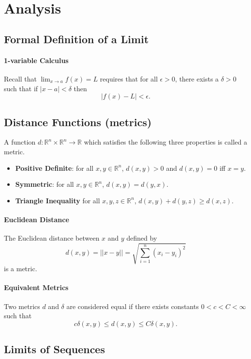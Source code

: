 
\section{Analysis}

\subsection{Formal Definition of a Limit}
\paragraph{1-variable Calculus}
Recall that \(\lim_{x\to a} f(x) = L\) requires that for all \(\epsilon > 0\),
there exists a \(\delta > 0 \) such that if \(|x-a| < \delta\)
then \[|f(x) - L| < \epsilon.\]

\subsection{Distance Functions (metrics)}
A function 
\(d: \mathbb{R}^n \times \mathbb{R}^n \to \mathbb{R}\)
which satisfies the following three properties is called a metric.
\begin{itemize}
    \item \textbf{Positive Definite}: for all \(x,y \in \mathbb{R}^n\), \(d(x,y) > 0\)
    and \(d(x, y) = 0\) iff \(x = y\).
    \item \textbf{Symmetric}: for all \(x,y \in \mathbb{R}^n\), \(d(x,y) = d(y, x)\).
    \item \textbf{Triangle Inequality} for all \(x,y,z \in \mathbb{R}^n\), 
    \(d(x,y) + d(y,z) \geq d(x, z)\).
\end{itemize}

\paragraph{Euclidean Distance} The Euclidean distance between \(x\) and \(y\) defined by 
\[d(x,y) = ||x - y|| = \sqrt{\sum_{i=1}^n (x_i - y_i)^2}\]
is a metric.

\paragraph{Equivalent Metrics}
Two metrics \(d\) and \(\delta\) are considered equal if 
there exists constants \(0 < c < C < \infty\) such that
\[ c\delta (x,y) \leq d(x,y) \leq C \delta(x, y).\]

\subsection{Limits of Sequences}
